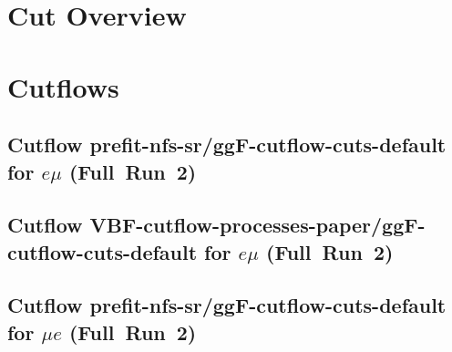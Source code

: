 \documentclass{article}
\begin{document}
\section[Cut Overview]{Cut Overview}

\centering


\section[Cutflows]{Cutflows}

\centering

\subsection[Cutflow prefit-nfs-sr/ggF-cutflow-cuts-default for \ensuremath{e\mu} (Full~Run~2)]{Cutflow prefit-nfs-sr/ggF-cutflow-cuts-default for \ensuremath{e\mu} (Full~Run~2)}

\centering


\subsection[Cutflow VBF-cutflow-processes-paper/ggF-cutflow-cuts-default for \ensuremath{e\mu} (Full~Run~2)]{Cutflow VBF-cutflow-processes-paper/ggF-cutflow-cuts-default for \ensuremath{e\mu} (Full~Run~2)}

\centering


\subsection[Cutflow prefit-nfs-sr/ggF-cutflow-cuts-default for \ensuremath{\mu{}e} (Full~Run~2)]{Cutflow prefit-nfs-sr/ggF-cutflow-cuts-default for \ensuremath{\mu{}e} (Full~Run~2)}

\centering

\end{document}
